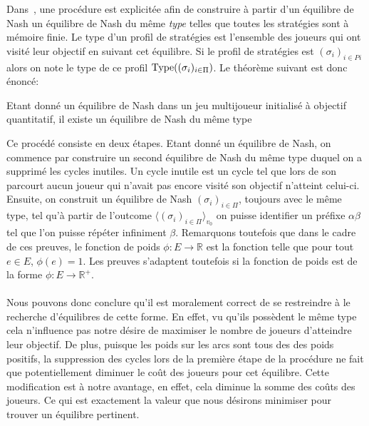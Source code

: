 Dans~\cite{juliePhd}, une procédure est explicitée afin de construire à partir d'un équilibre de Nash un équilibre de Nash du même \emph{type} telles que toutes les stratégies sont à mémoire finie. Le type d'un profil de stratégies est l'ensemble des joueurs qui ont visité leur objectif en suivant cet équilibre. Si le profil de stratégies est $(\sigma_i)_{i \in Pi}$ alors on note le type de ce profil $\operatorname*{Type}((\sigma_i)_{i\in \Pi})$. Le théorème suivant est donc énoncé:

\begin{thm}
	Etant donné un équilibre de Nash dans un jeu multijoueur initialisé à objectif quantitatif, il existe un équilibre de Nash du même type
\end{thm}

Ce procédé consiste en deux étapes. Etant donné un équilibre de Nash, on commence par construire un second équilibre de Nash du même type duquel on a supprimé les cycles inutiles. Un cycle inutile est un cycle tel que lors de son parcourt aucun joueur qui n'avait pas encore visité son objectif n'atteint celui-ci. Ensuite, on construit un équilibre de Nash $(\sigma_i)_{i\in \Pi}$, toujours avec le même type, tel qu'à partir de l'outcome $\langle (\sigma_i)_{i\in \Pi}\rangle_{v_0}$ on puisse identifier un préfixe $\alpha\beta$ tel que l'on puisse répéter infiniment $\beta$.
Remarquons toutefois que dans le cadre de ces preuves, le fonction de poids $\phi: E \rightarrow \mathbb{R}$ est la fonction telle que pour tout $e \in E$, $\phi(e) = 1$. Les preuves s'adaptent toutefois si la fonction de poids est de la forme $\phi : E \rightarrow \mathbb{R}^{+}$.\\
\\

Nous pouvons donc conclure qu'il est moralement correct de se restreindre à le recherche d'équilibres de cette forme. En effet, vu qu'ils possèdent le même type cela n'influence pas notre désire de maximiser le nombre de joueurs d'atteindre leur objectif. De plus, puisque les poids sur les arcs sont tous des des poids positifs, la suppression des cycles lors de la première étape de la procédure ne fait que potentiellement diminuer le coût des joueurs pour cet équilibre. Cette modification est à notre avantage, en effet, cela diminue la somme des coûts des joueurs. Ce qui est exactement la valeur que nous désirons minimiser pour trouver un équilibre pertinent.\\

